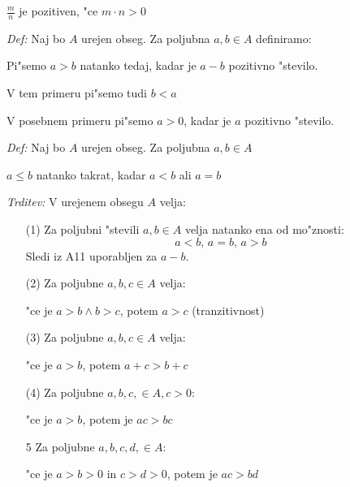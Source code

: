\(\frac{m}{n}\) je pozitiven, "ce \(m \cdot n > 0\)

\emph{Def:} Naj bo \(A\) urejen obseg. Za poljubna \(a, b \in A\) definiramo:

\hspace*{12pt}Pi"semo \(a > b\) natanko tedaj, kadar je \(a - b\) pozitivno "stevilo.

\hspace*{12pt}V tem primeru pi"semo tudi \(b < a\)

\hspace*{12pt}V posebnem primeru pi"semo \(a > 0\), kadar je \(a\) pozitivno "stevilo.

\emph{Def:} Naj bo \(A\) urejen obseg. Za poljubna \(a, b \in A\)

\hspace*{12pt}\(a \leq b\) natanko takrat, kadar \(a < b\) ali \(a = b\)

\emph{Trditev:} V urejenem obsegu \(A\) velja:
\begin{enumerate}
	\item[(1)] Za poljubni "stevili \(a, b \in A\) velja natanko ena od mo"znosti:
	\[a < b \text{, } a = b \text{, } a > b\]
	Sledi iz A11 uporabljen za \(a - b\).
	
	\item[(2)] Za poljubne \(a, b, c \in A\) velja:
	
	"ce je \(a > b \land b > c\), potem \(a > c\) (tranzitivnost)
	\item[(3)] Za poljubne \(a, b, c \in A\) velja:
	
	"ce je \(a > b\), potem \(a + c > b + c\)
	\item[(4)] Za poljubne \(a, b, c, \in A, c > 0\):
	
	"ce je \(a > b\), potem je \(ac > bc\)
	\item[5] Za poljubne \(a, b, c, d, \in A\):
	
	"ce je \(a > b > 0\) in \(c > d > 0\), potem je \(ac > bd\)
\end{enumerate}

